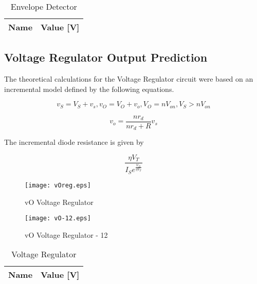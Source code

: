 \begin{table}[h]
  \centering
  \begin{tabular}{|l|r|}
    \hline    
    {\bf Name} & {\bf Value [V]} \\ \hline
    
  \end{tabular}
  \caption{Envelope Detector}
  \label{tab:Envelope}
\end{table}
\FloatBarrier


\subsection{Voltage Regulator Output Prediction}
\label{vr}

The theoretical calculations for the Voltage Regulator circuit were based on an incremental model defined by the following equations.

\begin{equation}
v_S=V_S+v_s , v_O=V_O+v_o , V_O=nV_{on} , V_S>nV_{on}
\label{eq:kvl7}
\end{equation}

\begin{equation}
v_o=\frac{nr_d}{nr_d+R}v_s
\label{eq:kvl8}
\end{equation}

The incremental diode resistance is given by

\begin{equation}
\frac{\eta V_T}{I_Se^{\frac{V_D}{\eta V_T}}}
\label{eq:kvl9}
\end{equation}


\begin{figure}[h] \centering
\texttt{[image: vOreg.eps]}
\caption{vO Voltage Regulator}
\label{fig:vOreg}
\end{figure}


\begin{figure}[h] \centering
\texttt{[image: vO-12.eps]}
\caption{vO Voltage Regulator - 12}
\label{fig:vO-12}
\end{figure}


\begin{table}[h]
  \centering
  \begin{tabular}{|l|r|}
    \hline    
    {\bf Name} & {\bf Value [V]} \\ \hline
    
  \end{tabular}
  \caption{Voltage Regulator}
  \label{tab:Regulator}
\end{table}
\FloatBarrier







